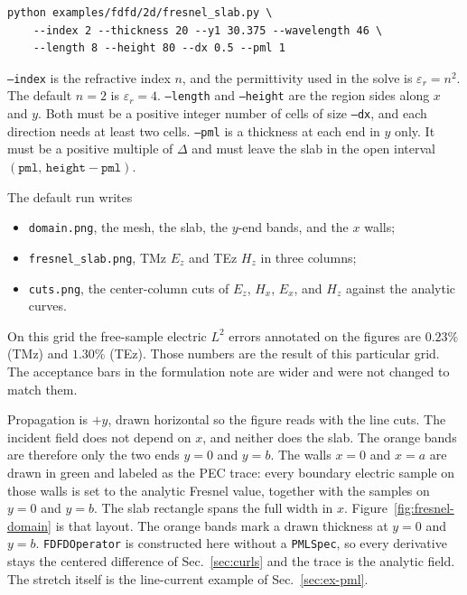 \documentclass[11pt,a4paper]{article}
\begin{document}
\begin{verbatim}
python examples/fdfd/2d/fresnel_slab.py \
    --index 2 --thickness 20 --y1 30.375 --wavelength 46 \
    --length 8 --height 80 --dx 0.5 --pml 1
\end{verbatim}

\texttt{--index} is the refractive index $n$, and the permittivity used in
the solve is $\varepsilon_r=n^2$. The default $n=2$ is $\varepsilon_r=4$.
\texttt{--length} and \texttt{--height} are the region sides along $x$ and
$y$. Both must be a positive integer number of cells of size
\texttt{--dx}, and each direction needs at least two cells.
\texttt{--pml} is a thickness at each end in $y$ only. It must be a
positive multiple of $\Delta$ and must leave the slab in the open interval
$(\texttt{pml},\,\texttt{height}-\texttt{pml})$.

The default run writes
\begin{center}
\end{center}
\begin{itemize}
\item \texttt{domain.png}, the mesh, the slab, the $y$-end bands, and the
$x$ walls;
\item \texttt{fresnel\_slab.png}, TMz $E_z$ and TEz $H_z$ in three columns;
\item \texttt{cuts.png}, the center-column cuts of $E_z$, $H_x$, $E_x$, and
$H_z$ against the analytic curves.
\end{itemize}
On this grid the free-sample electric $L^2$ errors annotated on the figures
are $0.23\%$ (TMz) and $1.30\%$ (TEz). Those numbers are the result of this
particular grid. The acceptance bars in the formulation note are wider and
were not changed to match them.

Propagation is $+y$, drawn horizontal so the figure reads with the line
cuts. The incident field does not depend on $x$, and neither does the slab.
The orange bands are therefore only the two ends $y=0$ and $y=b$. The walls
$x=0$ and $x=a$ are drawn in green and labeled as the PEC trace: every
boundary electric sample on those walls is set to the analytic Fresnel
value, together with the samples on $y=0$ and $y=b$. The slab rectangle
spans the full width in $x$. Figure~\ref{fig:fresnel-domain} is that
layout. The orange bands mark a drawn thickness at $y=0$ and $y=b$.
\texttt{FDFDOperator} is constructed here without a \texttt{PMLSpec}, so
every derivative stays the centered difference of Sec.~\ref{sec:curls} and
the trace is the analytic field. The stretch itself is the line-current
example of Sec.~\ref{sec:ex-pml}.
\end{document}
